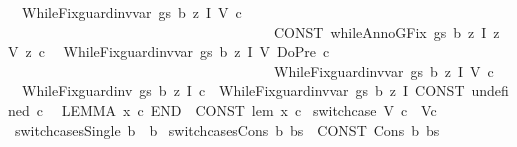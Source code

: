 \begin{isabellebody}
\isanewline
\ \ {\isachardoublequoteopen}{\isacharunderscore}WhileFix{\isacharunderscore}guard{\isacharunderscore}inv{\isacharunderscore}var\ gs\ b\ z\ I\ V\ c{\isachardoublequoteclose}\ {\isacharequal}{\isachargreater}\ \isanewline
\ \ \ \ \ \ \ \ \ \ \ \ \ \ \ \ \ \ \ \ \ \ \ \ \ \ \ \ \ \ \ \ \ \ \ \ \ \ {\isachardoublequoteopen}CONST\ whileAnnoGFix\ gs\ {\isacharbraceleft}{\isacharbar}b{\isacharbar}{\isacharbraceright}\ {\isacharparenleft}{\isasymlambda}z{\isachardot}\ I{\isacharparenright}\ {\isacharparenleft}{\isasymlambda}z{\isachardot}\ V{\isacharparenright}\ {\isacharparenleft}{\isasymlambda}z{\isachardot}\ c{\isacharparenright}{\isachardoublequoteclose}\isanewline
\ \ {\isachardoublequoteopen}{\isacharunderscore}WhileFix{\isacharunderscore}guard{\isacharunderscore}inv{\isacharunderscore}var\ gs\ b\ z\ I\ V\ {\isacharparenleft}{\isacharunderscore}DoPre\ c{\isacharparenright}{\isachardoublequoteclose}\ {\isacharless}{\isacharequal}\ \isanewline
\ \ \ \ \ \ \ \ \ \ \ \ \ \ \ \ \ \ \ \ \ \ \ \ \ \ \ \ \ \ \ \ \ \ \ \ \ \ {\isachardoublequoteopen}{\isacharunderscore}WhileFix{\isacharunderscore}guard{\isacharunderscore}inv{\isacharunderscore}var\ gs\ {\isacharbraceleft}{\isacharbar}b{\isacharbar}{\isacharbraceright}\ z\ I\ V\ c{\isachardoublequoteclose}\isanewline
\ \ {\isachardoublequoteopen}{\isacharunderscore}WhileFix{\isacharunderscore}guard{\isacharunderscore}inv\ gs\ b\ z\ I\ c{\isachardoublequoteclose}\ {\isacharequal}{\isacharequal}\ {\isachardoublequoteopen}{\isacharunderscore}WhileFix{\isacharunderscore}guard{\isacharunderscore}inv{\isacharunderscore}var\ gs\ b\ z\ I\ {\isacharparenleft}CONST\ undefined{\isacharparenright}\ c{\isachardoublequoteclose}\isanewline
\ \ {\isachardoublequoteopen}LEMMA\ x\ c\ END{\isachardoublequoteclose}\ {\isacharequal}{\isacharequal}\ {\isachardoublequoteopen}CONST\ lem\ x\ c{\isachardoublequoteclose}\isanewline
{}\isamarkupfalse%
\isanewline
\ {\isachardoublequoteopen}{\isacharparenleft}{\isacharunderscore}switchcase\ V\ c{\isacharparenright}{\isachardoublequoteclose}\ {\isacharequal}{\isachargreater}\ {\isachardoublequoteopen}{\isacharparenleft}V{\isacharcomma}c{\isacharparenright}{\isachardoublequoteclose}\isanewline
\ {\isachardoublequoteopen}{\isacharparenleft}{\isacharunderscore}switchcasesSingle\ b{\isacharparenright}{\isachardoublequoteclose}\ {\isacharequal}{\isachargreater}\ {\isachardoublequoteopen}{\isacharbrackleft}b{\isacharbrackright}{\isachardoublequoteclose}\isanewline
\ {\isachardoublequoteopen}{\isacharparenleft}{\isacharunderscore}switchcasesCons\ b\ bs{\isacharparenright}{\isachardoublequoteclose}\ {\isacharequal}{\isachargreater}\ {\isachardoublequoteopen}CONST\ Cons\ b\ bs{\isachardoublequoteclose}\isanewline

\end{isabellebody}
